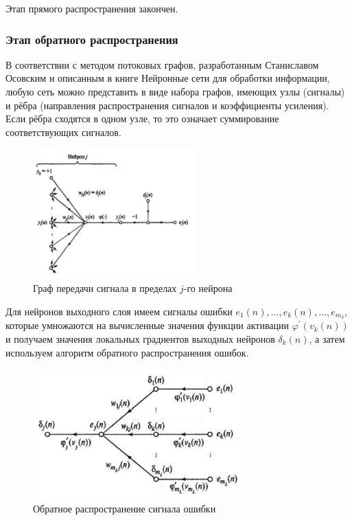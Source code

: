 \documentclass{article}
\numberwithin{equation}{subsection}
\begin{document}
Этап прямого распространения закончен.




\subsubsection{Этап обратного распространения}

В соответствии с методом потоковых графов, разработанным Станиславом Осовским и описанным в книге
\glqq Нейронные сети для обработки информации\grqq, любую сеть можно представить в виде набора графов,
 имеющих узлы (сигналы) и рёбра (направления распространения сигналов и коэффициенты усиления).
Если рёбра сходятся в одном узле, то это означает суммирование соответствующих сигналов.

\begin{figure}[H]
    \centering
    \includegraphics[height=5cm]{lec_neuro_08_4_3.png}
    \caption{Граф передачи сигнала в пределах $j$-го нейрона}
    \label{lec_neuro_08_4_3}
\end{figure}

Для нейронов выходного слоя имеем сигналы ошибки $e_1(n),\dots,e_k(n),\dots,e_{m_3}$, которые 
умножаются на вычисленные значения функции активации $\varphi^{\prime}(v_k(n))$ и получаем значения 
локальных градиентов выходных нейронов $\delta_k(n)$, а затем используем алгоритм обратного 
распространения ошибок.

\begin{figure}[htbp]
    \centering
    \includegraphics[height=5cm]{lec_neuro_08_4_5.png}
    \caption{Обратное распространение сигнала ошибки}
    \label{lec_neuro_08_4_5}
\end{figure}
\end{document}
